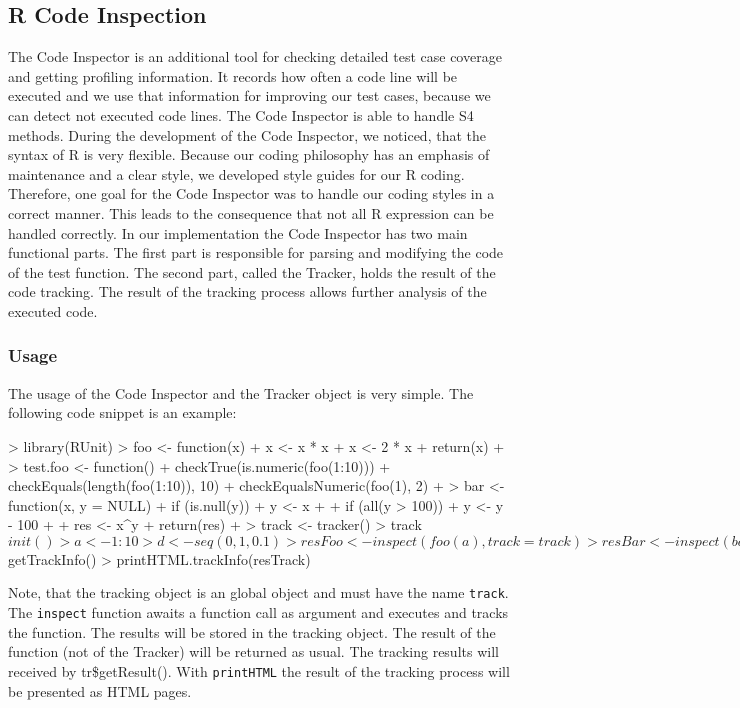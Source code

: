 \documentclass[12pt, a4paper]{article}
\begin{document}
\subsection{R Code Inspection}
\label{subsection:RCodeInspection}
The Code Inspector is an additional tool for checking detailed test case coverage and getting profiling information.
It records how often a code line will be executed and we use that information for improving our test cases, because we can detect not executed code lines.
The Code Inspector is able to handle S4 methods.
During the development of the Code Inspector, we noticed, that the syntax of R is very flexible.
Because our coding philosophy has an emphasis of maintenance and a clear style, we developed style guides for our R coding.
Therefore, one goal for the Code Inspector was to handle our coding styles in a correct manner.
This leads to the consequence that not all R expression can be handled correctly.
In our implementation the Code Inspector has two main functional parts.
The first part is responsible for parsing and modifying the code of the test function.
The second part, called the Tracker, holds the result of the code tracking.
The result of the tracking process allows further analysis of the executed code.

\subsubsection{Usage}
The usage of the Code Inspector and the Tracker object is very simple. The following code snippet is an example:
\begin{Schunk}
\begin{Sinput}
> library(RUnit)
> foo <- function(x) {
+     x <- x * x
+     x <- 2 * x
+     return(x)
+ }
> test.foo <- function() {
+     checkTrue(is.numeric(foo(1:10)))
+     checkEquals(length(foo(1:10)), 10)
+     checkEqualsNumeric(foo(1), 2)
+ }
> bar <- function(x, y = NULL) {
+     if (is.null(y)) {
+         y <- x
+     }
+     if (all(y > 100)) {
+         y <- y - 100
+     }
+     res <- x^y
+     return(res)
+ }
> track <- tracker()
> track$init()
> a <- 1:10
> d <- seq(0, 1, 0.1)
> resFoo <- inspect(foo(a), track = track)
> resBar <- inspect(bar(d), track = track)
> resTrack <- track$getTrackInfo()
> printHTML.trackInfo(resTrack)
\end{Sinput}
\end{Schunk}

Note, that the tracking object is an global object and must have the name {\tt track}.
The {\tt inspect} function awaits a function call as argument and executes and tracks the function.
The results will be stored in the tracking object.
The result of the function (not of the Tracker) will be returned as usual.
The tracking results will received by tr\$getResult().
With {\tt printHTML} the result of the tracking process will be presented as HTML pages.
\end{document}
